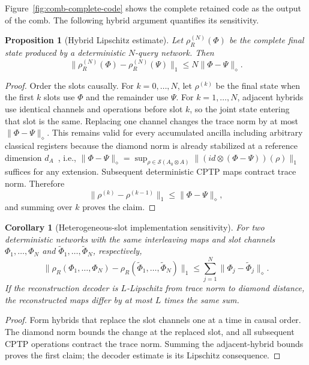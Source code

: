 \documentclass[11pt,a4paper]{article}
\theoremstyle{definition}
\theoremstyle{plain}
\newtheorem{proposition}[theorem]{Proposition}
\newtheorem{corollary}[theorem]{Corollary}
\theoremstyle{remark}
\newcommand{\Sstate}{\mathcal{S}}
\begin{document}
Figure~\ref{fig:comb-complete-code} shows the complete retained code as the output of the comb. The following hybrid argument quantifies its sensitivity.



\begin{proposition}[Hybrid Lipschitz estimate]
\label{prop:physical-continuity}
Let $\rho_R^{(N)}(\Phi)$ be the complete final state produced by a
deterministic $N$-query network. Then
\[
\|\rho_R^{(N)}(\Phi)-\rho_R^{(N)}(\Psi)\|_1
\leq N\|\Phi-\Psi\|_\diamond.
\]
\end{proposition}

\begin{proof}
Order the slots causally. For $k=0,\ldots,N$, let $\rho^{(k)}$ be the
final state when the first $k$ slots use $\Phi$ and the remainder use
$\Psi$. For $k=1,\ldots,N$, adjacent hybrids use identical channels and
operations before slot $k$, so the joint state entering that slot is the
same. Replacing one channel changes the trace norm by at most
$\|\Phi-\Psi\|_\diamond$. This remains valid for every accumulated ancilla
including arbitrary classical registers because the diamond norm is already stabilized at a reference dimension
$d_A$~\cite{Watrous2018}, i.e., $\|\Phi-\Psi\|_\diamond=\sup_{\rho\in\Sstate(A_0\otimes A)}\|(id\otimes(\Phi-\Psi))(\rho)\|_1$ suffices for any extension. Subsequent deterministic CPTP maps contract trace norm. Therefore
\[
\|\rho^{(k)}-\rho^{(k-1)}\|_1
\leq\|\Phi-\Psi\|_\diamond,
\]
and summing over $k$ proves the claim.
\end{proof}

\begin{corollary}[Heterogeneous-slot implementation sensitivity]
\label{cor:heterogeneous-slots}
For two deterministic networks with the same interleaving maps and slot
channels $\Phi_1,\ldots,\Phi_N$ and
$\widetilde\Phi_1,\ldots,\widetilde\Phi_N$, respectively,
\[
\|\rho_R(\Phi_1,\ldots,\Phi_N)
-\rho_R(\widetilde\Phi_1,\ldots,\widetilde\Phi_N)\|_1
\leq
\sum_{j=1}^N\|\Phi_j-\widetilde\Phi_j\|_\diamond.
\]
If the reconstruction decoder is $L$-Lipschitz from trace norm to
diamond distance, the reconstructed maps differ by at most $L$ times the
same sum.
\end{corollary}

\begin{proof}
Form hybrids that replace the slot channels one at a time in causal order.
The diamond norm bounds the change at the replaced slot, and all subsequent
CPTP operations contract the trace norm. Summing the adjacent-hybrid bounds
proves the first claim; the decoder estimate is its Lipschitz consequence.
\end{proof}
\end{document}
